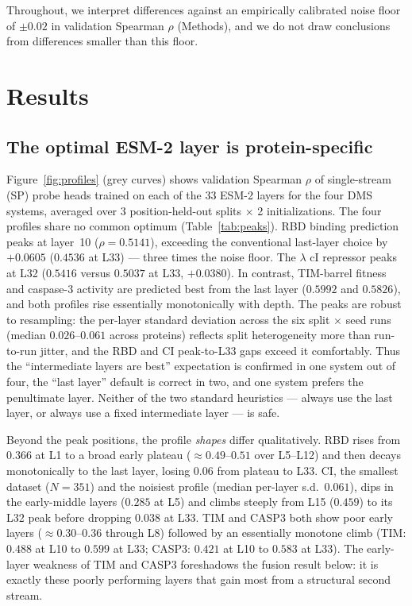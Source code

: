\documentclass[11pt]{article}
\begin{document}
Throughout, we interpret differences against an empirically calibrated noise floor of
$\pm 0.02$ in validation Spearman $\rho$ (Methods), and we do not draw conclusions from
differences smaller than this floor.

\section{Results}

\subsection{The optimal ESM-2 layer is protein-specific}

Figure~\ref{fig:profiles} (grey curves) shows validation Spearman $\rho$ of single-stream
(SP) probe heads trained on each of the 33 ESM-2 layers for the four DMS systems, averaged
over 3 position-held-out splits $\times$ 2 initializations. The four profiles share no
common optimum (Table~\ref{tab:peaks}). RBD binding prediction peaks at layer~10
($\rho=0.5141$), exceeding the conventional last-layer choice by $+0.0605$ ($0.4536$ at
L33) --- three times the noise floor. The $\lambda$ cI repressor peaks at L32
($0.5416$ versus $0.5037$ at L33, $+0.0380$). In contrast, TIM-barrel fitness and caspase-3
activity are predicted best from the last layer ($0.5992$ and $0.5826$), and both profiles
rise essentially monotonically with depth. The peaks are robust to resampling: the
per-layer standard deviation across the six split $\times$ seed runs (median $0.026$--$0.061$
across proteins) reflects split heterogeneity more than run-to-run jitter, and the RBD and CI
peak-to-L33 gaps exceed it comfortably. Thus the ``intermediate layers are best''
expectation is confirmed in one system out of four, the ``last layer'' default is correct in
two, and one system prefers the penultimate layer. Neither of the two standard heuristics
--- always use the last layer, or always use a fixed intermediate layer --- is safe.

Beyond the peak positions, the profile \emph{shapes} differ qualitatively. RBD rises from
$0.366$ at L1 to a broad early plateau ($\approx 0.49$--$0.51$ over L5--L12) and then decays
monotonically to the last layer, losing $0.06$ from plateau to L33. CI, the smallest dataset
($N=351$) and the noisiest profile (median per-layer s.d.\ $0.061$), dips in the early-middle
layers ($0.285$ at L5) and climbs steeply from L15 ($0.459$) to its L32 peak before dropping
$0.038$ at L33. TIM and CASP3 both show poor early layers ($\approx 0.30$--$0.36$ through L8)
followed by an essentially monotone climb (TIM: $0.488$ at L10 to $0.599$ at L33; CASP3:
$0.421$ at L10 to $0.583$ at L33). The early-layer weakness of TIM and CASP3 foreshadows the
fusion result below: it is exactly these poorly performing layers that gain most from a
structural second stream.
\end{document}
